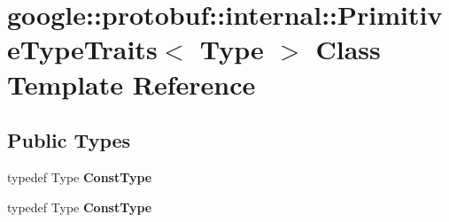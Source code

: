 \hypertarget{classgoogle_1_1protobuf_1_1internal_1_1PrimitiveTypeTraits}{}\section{google\+:\+:protobuf\+:\+:internal\+:\+:Primitive\+Type\+Traits$<$ Type $>$ Class Template Reference}
\label{classgoogle_1_1protobuf_1_1internal_1_1PrimitiveTypeTraits}
\subsection*{Public Types}
\begin{DoxyCompactItemize}
\item 
\mbox{\label{classgoogle_1_1protobuf_1_1internal_1_1PrimitiveTypeTraits_aadd692818822dd52d972c73a01dc2c19}} 
typedef Type {\bfseries Const\+Type}
\item 
\mbox{\label{classgoogle_1_1protobuf_1_1internal_1_1PrimitiveTypeTraits_aadd692818822dd52d972c73a01dc2c19}} 
typedef Type {\bfseries Const\+Type}
\end{DoxyCompactItemize}
